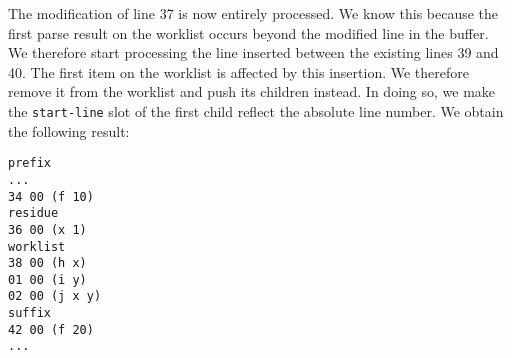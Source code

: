 The modification of line 37 is now entirely processed.  We know this
because the first parse result on the worklist occurs beyond the
modified line in the buffer.  We therefore start processing the line
inserted between the existing lines 39 and 40.  The first item on the
worklist is affected by this insertion.  We therefore remove it from
the worklist and push its children instead.  In doing so, we make the
\texttt{start-line} slot of the first child reflect the absolute line
number.  We obtain the following result:

\begin{verbatim}
prefix
...
34 00 (f 10)
residue
36 00 (x 1)
worklist
38 00 (h x)
01 00 (i y)
02 00 (j x y)
suffix
42 00 (f 20)
...
\end{verbatim}
